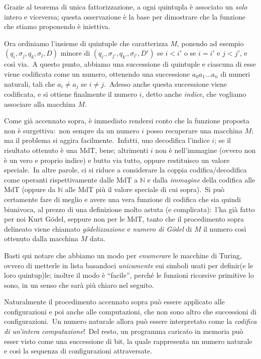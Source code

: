 Grazie al teorema di unica fattorizzazione, a ogni quintupla è associato un \textit{solo} intero e viceversa; questa osservazione è la base per dimostrare che la funzione che stiamo proponendo è iniettiva.\

Ora ordiniamo l'insieme di quintuple che caratterizza $M$, ponendo ad esempio $(q_i, \sigma_j, q_k, \sigma_l, D)$ minore di $(q_{i'}, \sigma_{j'}, q_{k'}, \sigma_{l'}, D')$ se $i < i'$ o se $i =i'$ e $j<j'$, e così via.\
A questo punto, abbiamo una successione di quintuple e ciascuna di esse viene codificata come un numero, ottenendo una successione $a_0 a_1 \dots a_n$ di numeri naturali, tali che $a_i \neq a_j$ se $i\neq j$.\
Adesso anche questa successione viene codificata, e si ottiene finalmente il numero $i$, detto anche \textit{indice}, che vogliamo associare alla macchina $M$.\

Come già accennato sopra, è immediato rendersi conto che la funzione proposta non è surgettiva:\ non sempre da un numero $i$ posso recuperare una macchina $M$; ma il problema si aggira facilmente.\
Infatti, uno decodifica l'indice $i$; se il risultato ottenuto è una MdT, bene; altrimenti $i$ non è nell'immagine (ovvero non è un vero e proprio indice) e butto via tutto, oppure restituisco un valore speciale.\
In altre parole, ci si riduce a considerare la coppia codifica/decodifica come operanti rispettivamente dalle MdT a $\mathbb{N}$ e dalla \textit{immagine} della codifica alle MdT (oppure da $\mathbb{N}$ alle MdT più il valore speciale di cui sopra).\
Si può certamente fare di meglio e avere una vera funzione di codifica che sia quindi biunivoca, al prezzo di una definizione molto astuta (e complicata):\ l'ha già fatto per noi Kurt G\"odel, seppure non per le MdT, tanto che il procedimento sopra delineato viene chiamato \textit{g\"odelizzazione} e \textit{numero di G\"odel} di $M$ il numero così ottenuto dalla macchina $M$ data.

Basti qui notare che abbiamo un modo per \textit{enumerare} le macchine di Turing, ovvero di metterle in lista basandoci \textit{unicamente} sui simboli usati per definir(e le loro quintup)le; inoltre il modo è ``facile'', perché le funzioni ricorsive primitive lo sono, in un senso che sarà più chiaro nel seguito.\

Naturalmente il procedimento accennato sopra può essere applicato alle configurazioni e poi anche alle computazioni, che non sono altro che successioni di configurazioni.\
Un numero naturale allora può essere interpretato come la \textit{codifica di un'intera computazione}!\
Del resto, un programma caricato in memoria può esser visto come una successione di bit, la quale rappresenta un numero naturale e così la sequenza di configurazioni attraversate.\

